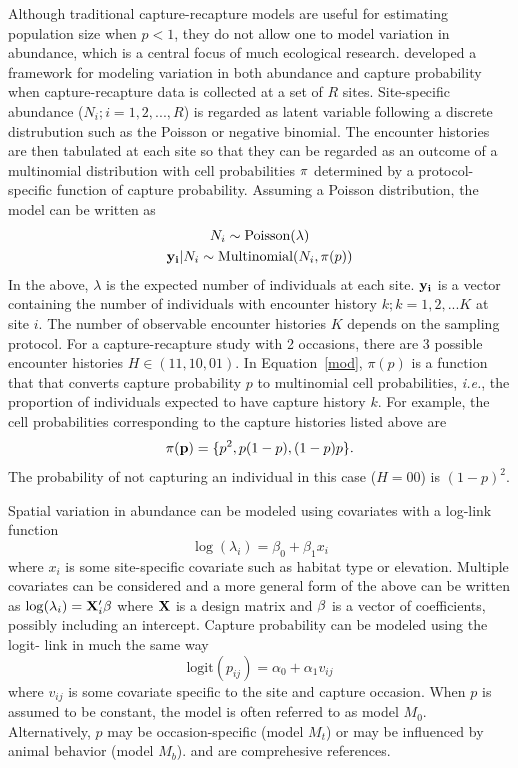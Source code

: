 \documentclass[a4paper]{article}
\begin{document}
Although traditional capture-recapture models are useful
for estimating population size when $p<1$, they do not allow one to model
variation in abundance, which is a central focus of much ecological
research.
\citet{royle_generalized_2004} developed a framework for
modeling variation in both abundance and capture
probability when capture-recapture data is collected at a set of
$R$ sites. Site-specific abundance ($N_i; i=1,2,...,R$) is regarded
as latent variable following a discrete distrubution such as the
Poisson or negative binomial. The encounter histories are then
tabulated at each site so that they can be regarded as an outcome of a
multinomial distribution with cell probabilities {$\bf \pi$}
determined by a protocol-specific function of capture
probability. Assuming a Poisson
distribution, the model can be written as
\begin{gather}
  N_i \sim \mbox{Poisson}(\lambda) \nonumber \\
  {\bf y_i}|N_i \sim \mbox{Multinomial}(N_i, \pi(p))
  \label{mod}
\end{gather}
In the above, $\lambda$ is the expected number of individuals at each
site. ${\bf y_i}$ is a vector containing the number of
individuals with encounter history $k; k=1,2,...K$ at site $i$. The
number of observable encounter histories $K$ depends on the sampling
protocol. For a capture-recapture study with 2 occasions, there are
3 possible encounter histories $H \in (11, 10, 01)$. In Equation~\ref{mod},
$\pi(p)$ is a function that that converts capture probability $p$ to
multinomial cell probabilities, \emph{i.e.}, the proportion
of individuals expected to have capture history $k$. For example, the
cell probabilities corresponding to the capture histories listed above
are
\[
{\bf \pi(p)} = \{ p^2, p(1-p), (1-p)p \}.
\]
The probability of not capturing an individual in this case ($H=00$)
is $(1-p)^2$.

Spatial variation in abundance can be modeled using covariates
with a log-link function
\[
\log(\lambda_i) = \beta_0 + \beta_1 x_i
\]
where $x_i$ is some site-specific covariate such as habitat type or
elevation. Multiple covariates can be considered and a more general
form of the above can be written as $\log(\lambda_i) =
{\bf X}_i' \bf \beta$ where ${\bf X}$ is a design matrix and
${\bf \beta}$ is a vector
of coefficients, possibly including an intercept.
Capture probability can be modeled using the logit-
link in much the same way
\[
\text{logit}(p_{ij}) = \alpha_0 + \alpha_1 v_{ij}
\]
where $v_{ij}$ is some covariate specific to the site and
capture occasion. When $p$ is assumed to be constant, the model is
often referred to as model $M_0$. Alternatively, $p$ may be
occasion-specific
(model $M_t$) or may be influenced by animal behavior (model
$M_b$). \citet{otis_etal:1978} and \citet{williams_etal:2002} are
comprehesive references.
\end{document}

